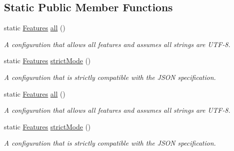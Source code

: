 \subsection*{Static Public Member Functions}
\begin{DoxyCompactItemize}
\item 
static \hyperlink{class_json_1_1_features}{Features} \hyperlink{class_json_1_1_features_a63894da6e2c100b38741fa933f3d33ae}{all} ()
\begin{DoxyCompactList}\small\item\em A configuration that allows all features and assumes all strings are U\+T\+F-\/8. \end{DoxyCompactList}\item 
static \hyperlink{class_json_1_1_features}{Features} \hyperlink{class_json_1_1_features_ae23176c14b2e79e81fb61fb1a8ab58ee}{strict\+Mode} ()
\begin{DoxyCompactList}\small\item\em A configuration that is strictly compatible with the J\+S\+ON specification. \end{DoxyCompactList}\item 
static \hyperlink{class_json_1_1_features}{Features} \hyperlink{class_json_1_1_features_a9f17db1b4ebbef8c645825344959481b}{all} ()
\begin{DoxyCompactList}\small\item\em A configuration that allows all features and assumes all strings are U\+T\+F-\/8. \end{DoxyCompactList}\item 
static \hyperlink{class_json_1_1_features}{Features} \hyperlink{class_json_1_1_features_aed3a2845df0cfd2ebe7338442361bd13}{strict\+Mode} ()
\begin{DoxyCompactList}\small\item\em A configuration that is strictly compatible with the J\+S\+ON specification. \end{DoxyCompactList}\end{DoxyCompactItemize}
